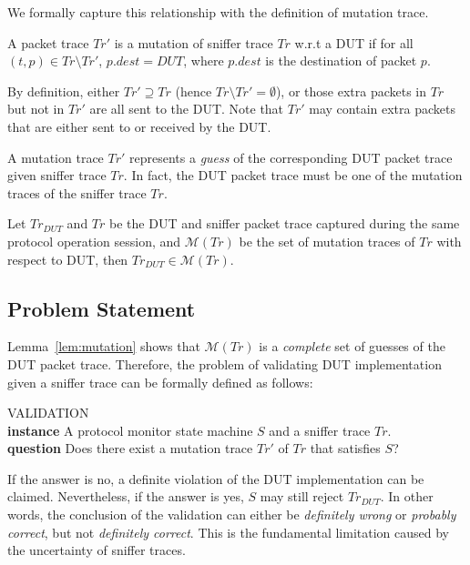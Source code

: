 We formally capture this relationship with the definition of mutation trace.

\begin{definition}
  \label{def:mutation}
  A packet trace $Tr'$ is a mutation of sniffer trace $Tr$ w.r.t a DUT if for
  all $(t, p) \in Tr \setminus Tr'$, $p.dest = DUT$, where $p.dest$ is the
  destination of packet $p$.
\end{definition}

By definition, either $Tr' \supseteq Tr$ (hence $Tr \setminus Tr' = \emptyset$),
or those extra packets in $Tr$ but not in $Tr'$ are all sent to the DUT. Note
that $Tr'$ may contain extra packets that are either sent to or received by
the DUT.

A mutation trace $Tr'$ represents a \textit{guess} of the corresponding DUT
packet trace given sniffer trace $Tr$.  In fact, the DUT packet trace must
be one of the mutation traces of the sniffer trace $Tr$.

\begin{lemma}
  Let $Tr_{DUT}$ and $Tr$ be the DUT and sniffer packet trace captured during
  the same protocol operation session, and $\mathcal{M}(Tr)$ be the set of
  mutation traces of $Tr$ with respect to DUT, then $Tr_{DUT} \in \mathcal{M}(Tr)$.
  \label{lem:mutation}
\end{lemma}%


\subsection{Problem Statement}
\label{subsec:problem}

Lemma~\ref{lem:mutation} shows that $\mathcal{M}(Tr)$ is a \textit{complete} set
of guesses of the DUT packet trace. Therefore, the problem of validating DUT
implementation given a sniffer trace can be formally defined as follows:

\begin{problem}
  \label{prob:validation}
  VALIDATION\\
  \textbf{instance} A protocol monitor state machine $S$ and a sniffer trace $Tr$.\\
  \textbf{question} Does there exist a mutation trace $Tr'$ of $Tr$ that satisfies $S$?
\end{problem}

If the answer is no, a definite violation of the DUT implementation can be
claimed. Nevertheless, if the answer is yes, $S$ may still reject $Tr_{DUT}$.
In other words, the conclusion of the validation can either be
\textit{definitely wrong} or \textit{probably correct}, but not
\textit{definitely correct}.  This is the fundamental limitation caused by the
uncertainty of sniffer traces.
